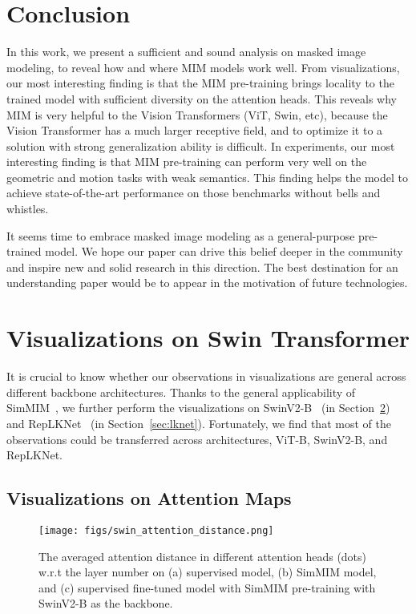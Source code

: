 \documentclass{article}
\begin{document}
\section{Conclusion}
In this work, we present a sufficient and sound analysis on masked image modeling, to reveal how and where MIM models work well. From visualizations, our most interesting finding is that the MIM pre-training brings locality to the trained model with sufficient diversity on the attention heads. This reveals why MIM is very helpful to the Vision Transformers (ViT, Swin, etc), because the Vision Transformer has a much larger receptive field, and to optimize it to a solution with strong generalization ability is difficult.
In experiments, our most interesting finding is that MIM pre-training can perform very well on the geometric and motion tasks with weak semantics. This finding helps the model to achieve state-of-the-art performance on those benchmarks without bells and whistles. 

It seems time to embrace masked image modeling as a general-purpose pre-trained model. We hope our paper can drive this belief deeper in the community and inspire new and solid research in this direction.
The best destination for an understanding paper would be to appear in the motivation of future technologies.



\newpage

\appendix



\section{Visualizations on Swin Transformer}\label{sec:vis_swin}

It is crucial to know whether our observations in visualizations are general across different backbone architectures. Thanks to the general applicability of SimMIM~\cite{xie2021simmim}, we further perform the visualizations on SwinV2-B~\cite{swinv2} (in Section~\ref{sec:vis_swin}) and RepLKNet~\cite{replknet} (in Section~\ref{sec:lknet}). Fortunately, we find that most of the observations could be transferred across architectures, ViT-B, SwinV2-B, and RepLKNet. 


\subsection{Visualizations on Attention Maps}

\begin{figure}[h]
    \centering
    \texttt{[image: figs/swin\_attention\_distance.png]}
  \vspace{-2.0em}
    \caption{The averaged attention distance in different attention heads (dots) w.r.t the layer number on (a) supervised model, (b) SimMIM model, and (c) supervised fine-tuned model with SimMIM pre-training with SwinV2-B as the backbone.}
    \label{fig:swin_attention_distance}
\end{figure}
\end{document}
